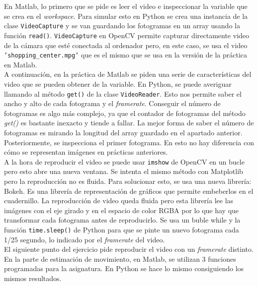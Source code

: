 \documentclass[a4paper,12pt]{report}
\begin{document}
En Matlab, lo primero que se pide es leer el video e inspeccionar la variable que se crea en el \emph{workspace}. Para simular esto en Python se crea una instancia de la clase \texttt{VideoCapture} y se van guardando los fotogramas en un array usando la función \texttt{read()}. \texttt{VideoCapture} en OpenCV permite capturar directamente video de la cámara que esté conectada al ordenador pero, en este caso, se usa el video \texttt{'shopping\_center.mpg'} que es el mismo que se usa en la versión de la práctica en Matlab.\\

A continuación, en la práctica de Matlab se piden una serie de características del video que se pueden obtener de la variable. En Python, se puede averiguar llamando al método \texttt{get()} de la clase \texttt{VideoReader}. Esto nos permite saber el ancho y alto de cada fotograma y el \emph{framerate}. Conseguir el número de fotogramas es algo más complejo, ya que el contador de fotogramas del método \emph{get()} es bastante inexacto y tiende a fallar. La mejor forma de saber el número de fotogramas es mirando la longitud del array guardado en el apartado anterior.\\

Posteriormente, se inspecciona el primer fotograma. En esto no hay diferencia con cómo se representan imágenes en prácticas anteriores.\\

A la hora de reproducir el video se puede usar \texttt{imshow} de OpenCV en un bucle pero esto abre una nueva ventana. Se intenta el mismo método con Matplotlib pero la reproducción no es fluida. Para solucionar esto, se usa una nueva librería: Bokeh. Es una librería de representación de gráficos que permite embeberlos en el cuadernillo. La reproducción de video queda fluida pero esta librería lee las imágenes con el eje girado y en el espacio de color RGBA por lo que hay que transformar cada fotograma antes de reproducirlo. Se usa un buble while y la función \texttt{time.sleep()} de Python para que se pinte un nuevo fotograma cada 1/25 segundo, lo indicado por el \emph{framerate} del video.\\

El siguiente punto del ejercicio pide reproducir el video con un \emph{framerate} distinto.\\

En la parte de estimación de movimiento, en Matlab, se utilizan 3 funciones programadas para la asignatura. En Python se hace lo mismo consiguiendo los mismos resultados. \\
\end{document}
